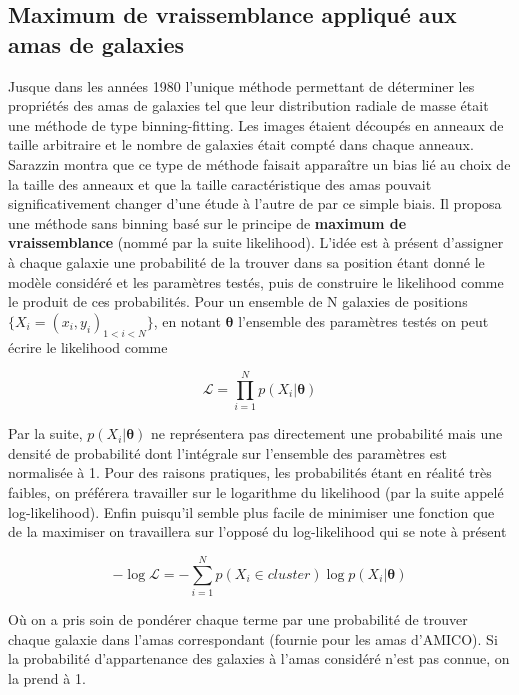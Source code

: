 \documentclass[a4paper,11pt]{article}
\numberwithin{equation}{section}
\begin{document}
  \subsection{Maximum de vraissemblance appliqué aux amas de galaxies}
    Jusque dans les années 1980 l'unique méthode permettant de déterminer les propriétés des amas de galaxies tel que leur distribution radiale de masse était une méthode de type binning-fitting. Les images étaient découpés en anneaux de taille arbitraire et le nombre de galaxies était compté dans chaque anneaux. Sarazzin montra\cite{Sarazin1980} que ce type de méthode faisait apparaître un bias lié au choix de la taille des anneaux et que la taille caractéristique des amas pouvait significativement changer d'une étude à l'autre de par ce simple biais. Il proposa une méthode sans binning basé sur le principe de \textbf{maximum de vraissemblance} (nommé par la suite likelihood).\newline
    L'idée est à présent d'assigner à chaque galaxie une probabilité de la trouver dans sa position étant donné le modèle considéré et les paramètres testés, puis de construire le likelihood comme le produit de ces probabilités. Pour un ensemble de N galaxies de positions $ \lbrace X_i = (x_i , y_i )_{1 < i < N} \rbrace $, en notant $\bm{\theta}$ l'ensemble des paramètres testés on peut écrire le likelihood comme
    
    \begin{equation}
      \label{eq:Likelihood}
      \mathscr{L} = \prod_{i=1}^N p( X_i | \bm{\theta})  %
    \end{equation}
    
    Par la suite, $p(X_i | \bm{\theta})$ ne représentera pas directement une probabilité mais une densité de probabilité dont l'intégrale sur l'ensemble des paramètres est normalisée à 1. Pour des raisons pratiques, les probabilités étant en réalité très faibles, on préférera travailler sur le logarithme du likelihood (par la suite appelé log-likelihood). Enfin puisqu'il semble plus facile de minimiser une fonction que de la maximiser on travaillera sur l'opposé du log-likelihood qui se note à présent
    
    \begin{equation}
      \label{eq:Log_Likelihood}
      - \log \mathscr{L} = - \sum_{i=1}^N p (X_i \in cluster) \log p (X_i | \bm{\theta})
    \end{equation}
    
    Où on a pris soin de pondérer chaque terme par une probabilité de trouver chaque galaxie dans l'amas correspondant (fournie pour les amas d'AMICO). Si la probabilité d'appartenance des galaxies à l'amas considéré n'est pas connue, on la prend à 1.
    
\end{document}
